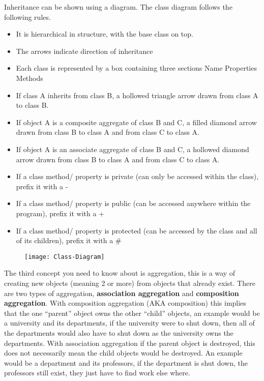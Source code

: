   	Inheritance can be shown using a diagram. The class diagram follows the following rules.
  	\begin{itemize}
        \setlength\itemsep{0cm}
  		\item It is hierarchical in structure, with the base class on top.
  		\item The arrows indicate direction of inheritance
  		\item Each class is represented by a box containing three sections
	  		\subitem Name
	  		\subitem Properties
	  		\subitem Methods
  		\item If class A inherits from class B, a hollowed triangle arrow drawn from class A to class B.
  		\item If object A is a composite aggregate of class B and C, a filled diamond arrow drawn from class B to class A and from class C to class A.
  		\item If object A is an associate aggregate of class B and C, a hollowed diamond arrow drawn from class B to class A and from class C to class A.
  		\item If a class method/ property is private (can only be accessed within the class), prefix it with a -
  		\item If a class method/ property is public (can be accessed anywhere within the program), prefix it with a +
  		\item If a class method/ property is protected (can be accessed by the class and all of its children), prefix it with a \#
  	\end{itemize}

  	\begin{figure}[H]
  		\centering
	  	\texttt{[image: Class-Diagram]}
    \end{figure}
  	The third concept you need to know about is aggregation, this is a way of creating new objects (meaning 2 or more) from objects that already exist. There are two types of aggregation, \textbf{association aggregation} and \textbf{composition aggregation}. With composition aggregation (AKA composition) this implies that the one ``parent'' object owns the other ``child'' objects, an example would be a university and its departments, if the university were to shut down, then all of the departments would also have to shut down as the university owns the departments. With association aggregation if the parent object is destroyed, this does not necessarily mean the child objects would be destroyed. An example would be a department and its professors, if the department is shut down, the professors still exist, they just have to find work else where.

